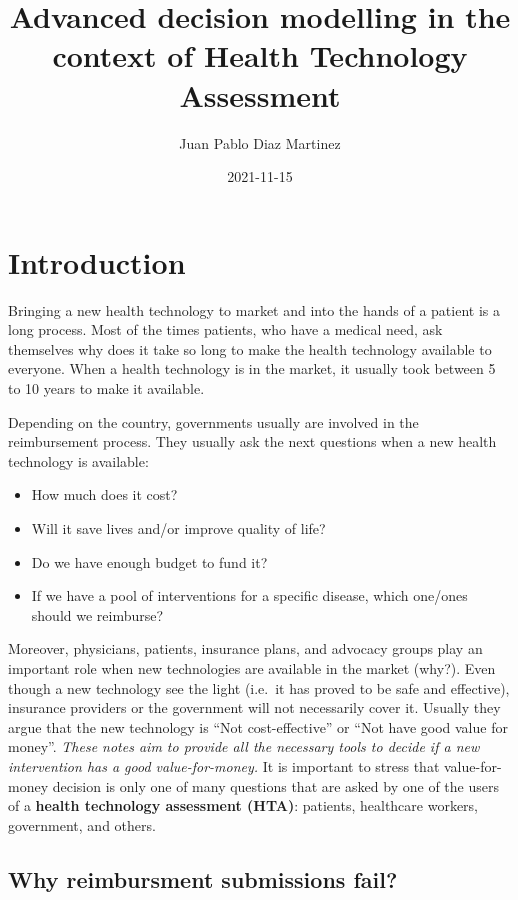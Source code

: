 \documentclass[
]{book}
\title{Advanced decision modelling in the context of Health Technology Assessment}
\author{Juan Pablo Diaz Martinez}
\date{2021-11-15}
\providecommand{\tightlist}{%
  \setlength{\itemsep}{0pt}\setlength{\parskip}{0pt}}
\begin{document}
\maketitle

{
\setcounter{tocdepth}{1}
\tableofcontents
}
\hypertarget{introduction}{%
\chapter*{Introduction}\label{introduction}}

Bringing a new health technology to market and into the hands of a patient is a long process. Most of the times patients, who have a medical need, ask themselves why does it take so long to make the health technology available to everyone. When a health technology is in the market, it usually took between 5 to 10 years to make
it available.

Depending on the country, governments usually are involved in the reimbursement process. They usually ask the next questions when a new health technology is available:

\begin{itemize}
\tightlist
\item
  How much does it cost?
\item
  Will it save lives and/or improve quality of life?
\item
  Do we have enough budget to fund it?
\item
  If we have a pool of interventions for a specific disease, which one/ones should we reimburse?
\end{itemize}

Moreover, physicians, patients, insurance plans, and advocacy groups play an important role when new technologies are available in the market (why?). Even though a new technology see the light (i.e.~it has proved to be safe and effective), insurance providers or the government will not necessarily cover it. Usually they argue that the new technology is ``Not cost-effective'' or ``Not have good value for money''. \emph{These notes aim to provide all the necessary tools to decide if a new intervention has a good value-for-money.} It is important to stress that value-for-money decision is only one of many questions that are asked by one of the users of a \textbf{health technology assessment (HTA)}: patients, healthcare workers, government, and others.

\hypertarget{why-reimbursment-submissions-fail}{%
\section*{Why reimbursment submissions fail?}\label{why-reimbursment-submissions-fail}}
\end{document}
